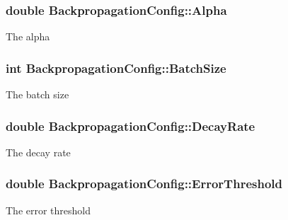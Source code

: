 \subsubsection[{Alpha}]{\setlength{\rightskip}{0pt plus 5cm}double Backpropagation\+Config\+::\+Alpha}\label{class_backpropagation_config_a79edf18125f39372ef11a0f087e734ab}


The alpha 

\hypertarget{class_backpropagation_config_a44b2e5b4975e49fbcd51a241575904d4}{}
\subsubsection[{Batch\+Size}]{\setlength{\rightskip}{0pt plus 5cm}int Backpropagation\+Config\+::\+Batch\+Size}\label{class_backpropagation_config_a44b2e5b4975e49fbcd51a241575904d4}


The batch size 

\hypertarget{class_backpropagation_config_a28853172211206ad458fbc72cabf252e}{}
\subsubsection[{Decay\+Rate}]{\setlength{\rightskip}{0pt plus 5cm}double Backpropagation\+Config\+::\+Decay\+Rate}\label{class_backpropagation_config_a28853172211206ad458fbc72cabf252e}


The decay rate 

\hypertarget{class_backpropagation_config_a5c50a9fcfd1a06421c6a0ae3c70a3a55}{}
\subsubsection[{Error\+Threshold}]{\setlength{\rightskip}{0pt plus 5cm}double Backpropagation\+Config\+::\+Error\+Threshold}\label{class_backpropagation_config_a5c50a9fcfd1a06421c6a0ae3c70a3a55}


The error threshold 

\hypertarget{class_backpropagation_config_a5f13785a5b5451815c46fa475af82fac}{}
